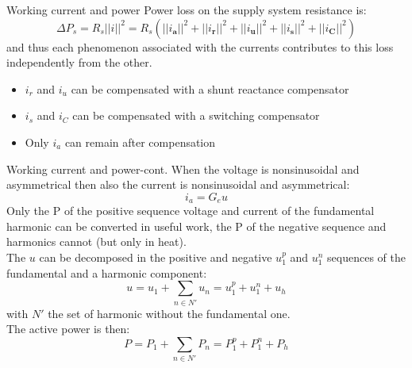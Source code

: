 \documentclass[aspectratio=169]{beamer}
\begin{document}
  \begin{frame}{Working current and power}{\insertsection}
    Power loss on the supply system resistance is: 
    \begin{equation}
    \Delta P_s = R_s||\pmb{\mathit{i}}||^2 = R_s\left(||\pmb{\mathit{i}_a}||^2 + ||\pmb{\mathit{i}_r}||^2 + ||\pmb{\mathit{i}_u}||^2 + ||\pmb{\mathit{i}_s}||^2 + ||\pmb{\mathit{i}_C}||^2\right)
    \end{equation}
    and thus each phenomenon associated with the currents contributes to this loss independently from the other.
    \begin{itemize}
      \item $\pmb{\mathit{i_r}}$ and $\pmb{\mathit{i_u}}$ can be compensated with a shunt reactance compensator
      \item $\pmb{\mathit{i_s}}$ and $\pmb{\mathit{i_C}}$ can be compensated with a switching compensator
      \item Only $\pmb{\mathit{i_a}}$ can remain after compensation
    \end{itemize}
  \end{frame}
  
  \begin{frame}{Working current and power-cont.}{\insertsection}
    When the voltage is nonsinusoidal and asymmetrical then also the current is nonsinusoidal and asymmetrical: 
    \begin{equation}
      \pmb{\mathit{i}}_a = G_e \pmb{\mathit{u}}
    \end{equation} 
    Only the P of the positive sequence voltage and current of the fundamental harmonic can be converted in useful work, the P of the negative sequence and harmonics cannot (but only in heat). \\
    The  $ \pmb{\mathit{u}}$ can be decomposed in the positive and negative $ \pmb{\mathit{u}}_{1}^{p}$ and $ \pmb{\mathit{u}}_{1}^{n}$ sequences of the fundamental and a harmonic component:
    \begin{equation}
      \pmb{\mathit{u}} =\pmb{\mathit{u}}_{1} + \sum_{n\in N'}\pmb{\mathit{u}}_{n} = \pmb{\mathit{u}}_{1}^{p} + \pmb{\mathit{u}}_{1}^{n} + \pmb{\mathit{u}}_{h}
    \end{equation}
    with $N'$ the set of harmonic without the fundamental one.\\
    The active power is then:
    \begin{equation}
      P =P_{1} + \sum_{n\in N'}P_{n} = P_{1}^{p} + P_{1}^{n} + P_{h}
    \end{equation}

  \end{frame}
\end{document}
